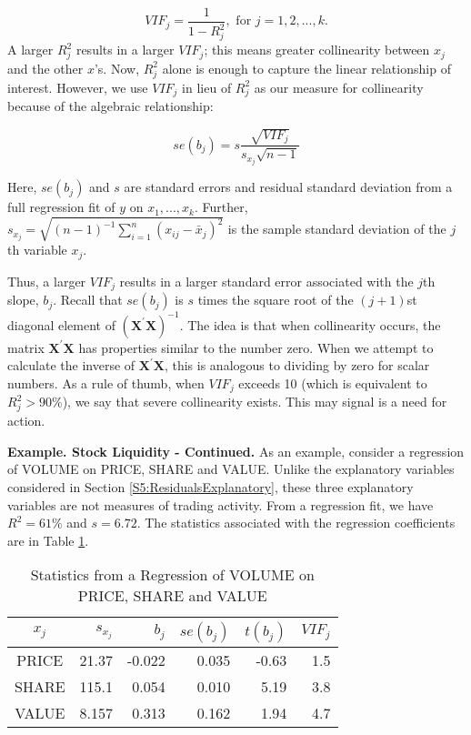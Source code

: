 \begin{equation*}
VIF_{j}=\frac{1}{1-R_{j}^{2}},\text{ \ \ \ for \ }j=1,2,...,k.
\end{equation*}
A larger $R_j^2$ results in a larger $VIF_{j}$; this means greater
collinearity between $x_{j}$ and the other $x$'s. Now, $R_j^2$ alone
is enough to capture the linear relationship of interest. However,
we use $VIF_{j}$ in lieu of $R_j^2$ as our measure for collinearity
because of the algebraic relationship:

\begin{equation} \label{E5:SEsAndVIFs}
se(b_{j}) = s \frac{\sqrt{VIF_{j}}}{s_{x_{j}}\sqrt{n-1}}
\end{equation}

\noindent Here, $se(b_{j})$ and $s$ are standard errors and residual
standard deviation from a full regression fit of $y$ on
$x_{1},...,x_{k}$. Further, $s_{x_j} = \sqrt{(n-1)^{-1}
\sum_{i=1}^{n}(x_{ij}-\bar{x}_{j})^{2} }$ is the sample standard
deviation of the $j$th variable $x_{j}$.

Thus, a larger $VIF_{j}$ results in a larger standard error
associated with the $j$th slope, $b_{j}$. Recall that $se(b_{j})$ is
$s$ times the square root of the $(j+1)$st diagonal element of
$(\mathbf{X^{\prime} X})^{-1}$. The idea is that when collinearity
occurs, the matrix $\mathbf{X^{\prime}X}$ has properties similar to
the number zero. When we attempt to calculate the inverse of
$\mathbf{X^{\prime} X}$, this is analogous to dividing by zero for
scalar numbers. As a rule of thumb, when $VIF_{j}$ exceeds 10 (which
is equivalent to $R_{j}^{2}>90\%$), we say that severe collinearity
exists. This may signal is a need for action.


\linejed

\textbf{Example. Stock Liquidity - Continued.} As an example,
consider a regression of VOLUME on PRICE, SHARE and VALUE. Unlike
the explanatory variables considered in Section
\ref{S5:ResidualsExplanatory}, these three explanatory variables are
not measures of trading activity. From a regression fit, we have
$R^{2}=61\%$ and $s=6.72$. The statistics associated with the
regression coefficients are in Table \ref{T5:LiquidRegression}.


\begin{table}[h]
\caption{\label{T5:LiquidRegression} Statistics from
a Regression of VOLUME on PRICE, SHARE and VALUE}

\begin{tabular}{crrrrr}
\hline
$x_j$ & $s_{x_j}$ & $b_j$ & $se(b_j)$ & $t(b_j)$ & $VIF_j$ \\
\hline PRICE& 21.37 & -0.022 & 0.035&
-0.63& 1.5 \\
SHARE & 115.1 & 0.054 & 0.010 &
5.19 & 3.8 \\
VALUE & 8.157 & 0.313 & 0.162 & 1.94 & 4.7
\\ \hline
\end{tabular}
\end{table}

